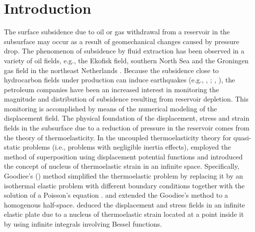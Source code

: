 \documentclass[P]{BrJG_submit}
\begin{document}
\section*{Introduction}
The surface subsidence due to oil or gas withdrawal from a reservoir in the subsurface may occur as a result of geomechanical changes caused by pressure drop.
The phenomenon of subsidence by fluid extraction  has been observed in a variety of oil fields, e.g., the Ekofisk field, southern North Sea \citep{Borges2020} and the Groningen gas field in the northeast Netherlands \citep{vanThienenFokker17}.
Because the subsidence close to hydrocarbon fields under production can induce earthquakes (e.g., \citeauthor{Dahmetal15}, \citeyear{Dahmetal15}; \citeauthor{Grigolietal17}, \citeyear{Grigolietal17}), the petroleum companies  have been an increased interest in monitoring the magnitude and distribution of subsidence resulting from reservoir depletion.
This monitoring is accomplished by means of the numerical modeling of the displacement field.
The physical foundation of the displacement, stress and strain fields in the subsurface due to a reduction of pressure in the reservoir comes from the theory of thermoelasticity.
In the uncoupled thermoelasticity theory for quasi-static problems (i.e., problems with negligible inertia effects), \cite{Goodier37} employed the method of superposition using
displacement potential functions and introduced the  concept of nucleus of thermoelastic strain in an infinite space.
Specifically, Goodiee’s (\citeyear{Goodier37}) method simplified the thermoelastic problem by replacing it by an isothermal elastic problem with different boundary conditions together with the solution of a Poisson’s equation \citep{Tao71}. 
\cite{Mindlin-Cheng50} and \cite{Sen51} extended the Goodiee's method to a homogenous half-space.
\cite{Sharma56} deduced the displacement and stress fields in an infinite elastic plate due to a nucleus of thermoelastic strain located at a point inside it by using infinite integrals involving Bessel functions.
\end{document}
